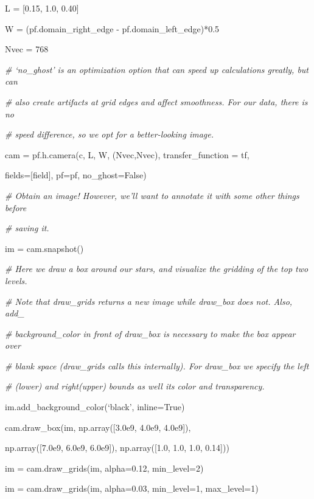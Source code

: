 L = [0.15, 1.0, 0.40]

W = (pf.domain\_right\_edge - pf.domain\_left\_edge)*0.5

Nvec = 768

{\it\# `no\_ghost' is an optimization option that can speed up calculations greatly, but can}
{\setlength{\parskip}{0pt}

{\it\# also create artifacts at grid edges and affect smoothness.  For our data, there is no}

{\it\# speed difference, so we opt for a better-looking image.}

cam = pf.h.camera(c, L, W, (Nvec,Nvec), transfer\_function = tf,
}

{\setlength{\parindent}{95pt}fields=[field], pf=pf, no\_ghost=False)}

{\it\# Obtain an image! However, we'll want to annotate it with some other things before}
{\setlength{\parskip}{0pt}

{\it\# saving it.}

im = cam.snapshot()
}

{\it\# Here we draw a box around our stars, and visualize the gridding of the top two levels.}
{\setlength{\parskip}{0pt}

{\it\# Note that draw\_grids returns a new image while draw\_box does not. Also, add\_}

{\it\# background\_color in front of draw\_box is necessary to make the box appear over}

{\it\# blank space (draw\_grids calls this internally). For draw\_box we specify the left}

{\it\# (lower) and right(upper) bounds as well its color and transparency.}

im.add\_background\_color(`black', inline=True)
}

cam.draw\_box(im, np.array([3.0e9, 4.0e9, 4.0e9]),

{\setlength{\parindent}{72pt}np.array([7.0e9, 6.0e9, 6.0e9]), np.array([1.0, 1.0, 1.0, 0.14]))}

im = cam.draw\_grids(im, alpha=0.12, min\_level=2)

im = cam.draw\_grids(im, alpha=0.03, min\_level=1, max\_level=1)

